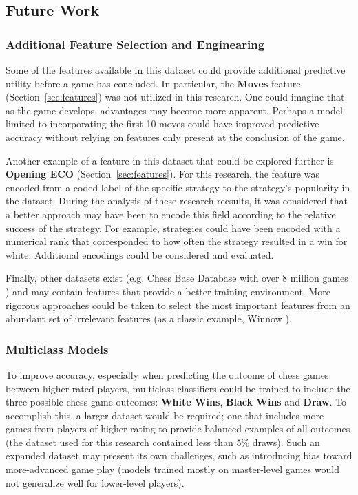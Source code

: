 \documentclass[12pt]{article}
\begin{document}
\subsection{Future Work}

\subsubsection{Additional Feature Selection and Enginearing}
\label{sec:feature-eng}
Some of the features available in this dataset could provide additional predictive utility before a game has concluded. In particular, the \textbf{Moves} feature (Section~\ref{sec:features}) was not utilized in this research. One could imagine that as the game develops, advantages may become more apparent. Perhaps a model limited to incorporating the first 10 moves could have improved predictive accuracy without relying on features only present at the conclusion of the game.

Another example of a feature in this dataset that could be explored further is \textbf{Opening ECO} (Section~\ref{sec:features}). For this research, the feature was encoded from a coded label of the specific strategy to the strategy's popularity in the dataset. During the analysis of these research reesults, it was considered that a better approach may have been to encode this field according to the relative success of the strategy. For example, strategies could have been encoded with a numerical rank that corresponded to how often the strategy resulted in a win for white. Additional encodings could be considered and evaluated.

Finally, other datasets exist (e.g. Chess Base Database with over 8 million games \cite{chessBaseDb}) and may contain features that provide a better training environment. More rigorous approaches could be taken to select the most important features from an abundant set of irrelevant features (as a classic example, Winnow \cite{Littlestone1988}).

\subsubsection{Multiclass Models}
\label{sec:multiclass}
To improve accuracy, especially when predicting the outcome of chess games between higher-rated players, multiclass classifiers could be trained to include the three possible chess game outcomes: \textbf{White Wins}, \textbf{Black Wins} and \textbf{Draw}. To accomplish this, a larger dataset would be required; one that includes more games from players of higher rating to provide balanced examples of all outcomes (the dataset used for this research contained less than $5\%$ draws). Such an expanded dataset may present its own challenges, such as introducing bias toward more-advanced game play (models trained mostly on master-level games would not generalize well for lower-level players).
\end{document}
